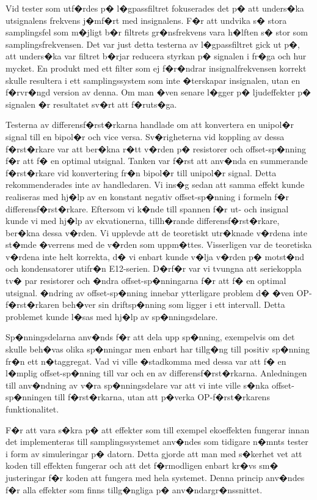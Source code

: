 \documentclass[a4paper]{article}
\begin{document}
Vid tester som utf�rdes p� l�gpassfiltret fokuserades det p� att unders�ka utsignalens frekvens j�mf�rt med insignalens. F�r att undvika s� stora samplingsfel som m�jligt b�r filtrets gr�nsfrekvens vara h�lften s� stor som samplingsfrekvensen. Det var just detta testerna av l�gpassfiltret gick ut p�, att unders�ka var filtret b�rjar reducera styrkan p� signalen i fr�ga och hur mycket. En produkt med ett filter som ej f�r�ndrar insignalfrekvensen korrekt skulle resultera i ett samplingssystem som inte �terskapar insignalen, utan en f�rvr�ngd version av denna. Om man �ven senare l�gger p� ljudeffekter p� signalen �r resultatet sv�rt att f�ruts�ga.

Testerna av differensf�rst�rkarna handlade om att konvertera en unipol�r signal till en bipol�r och vice versa. Sv�righeterna vid koppling av dessa f�rst�rkare var att ber�kna r�tt v�rden p� resistorer och offset-sp�nning f�r att f� en optimal utsignal. Tanken var f�rst att anv�nda en summerande f�rst�rkare vid konvertering fr�n bipol�r till unipol�r signal. Detta rekommenderades inte av handledaren. Vi ins�g sedan att samma effekt kunde realiseras med hj�lp av en konstant negativ offset-sp�nning i formeln f�r differensf�rst�rkare. Eftersom vi k�nde till spannen f�r ut- och insignal kunde vi med hj�lp av ekvationerna, tillh�rande differensf�rst�rkare, ber�kna dessa v�rden. Vi upplevde att de teoretiskt utr�knade v�rdena inte st�mde �verrens med de v�rden som uppm�ttes. Visserligen var de teoretiska v�rdena inte helt korrekta, d� vi enbart kunde v�lja v�rden p� motst�nd och kondensatorer utifr�n E12-serien. D�rf�r var vi tvungna att seriekoppla tv� par resistorer och �ndra offset-sp�nningarna f�r att f� en optimal utsignal. �ndring av offset-sp�nning innebar ytterligare problem d� �ven OP-f�rst�rkaren beh�ver sin driftsp�nning som ligger i ett intervall. Detta problemet kunde l�sas med hj�lp av sp�nningsdelare.

Sp�nningsdelarna anv�nds f�r att dela upp sp�nning, exempelvis om det skulle beh�vas olika sp�nningar men enbart har tillg�ng till positiv sp�nning fr�n ett n�taggregat. Vad vi ville �stadkomma med dessa var att f� en l�mplig offset-sp�nning till var och en av differensf�rst�rkarna. Anledningen till anv�ndning av v�ra sp�nningsdelare var att vi inte ville s�nka offset-sp�nningen till f�rst�rkarna, utan att p�verka OP-f�rst�rkarens funktionalitet.

F�r att vara s�kra p� att effekter som till exempel ekoeffekten fungerar innan det implementeras till samplingssystemet anv�ndes som tidigare n�mnts tester i form av simuleringar p� datorn. Detta gjorde att man med s�kerhet vet att koden till effekten fungerar och att det f�rmodligen enbart kr�vs sm� justeringar f�r koden att fungera med hela systemet. Denna princip anv�ndes f�r alla effekter som finns tillg�ngliga p� anv�ndargr�nssnittet.
\end{document}
